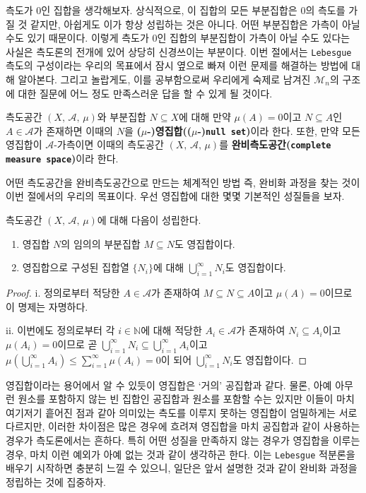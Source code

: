 측도가 0인 집합을 생각해보자. 상식적으로, 이 집합의 모든 부분집합은 0의 측도를 가질 것 같지만, 아쉽게도 이가 항상 성립하는 것은 아니다. 어떤 부분집합은 가측이 아닐수도 있기 때문이다. 이렇게 측도가 0인 집합의 부분집합이 가측이 아닐 수도 있다는 사실은 측도론의 전개에 있어 상당히 신경쓰이는 부분이다. 이번 절에서는 \texttt{Lebesgue} 측도의 구성이라는 우리의 목표에서 잠시 옆으로 빠져 이런 문제를 해결하는 방법에 대해 알아본다. 그리고 놀랍게도, 이를 공부함으로써 우리에게 숙제로 남겨진 $\mathcal{M}_n$의 구조에 대한 질문에 어느 정도 만족스러운 답을 할 수 있게 될 것이다.

\begin{definition}
    측도공간 $(X,\,\mathcal{A},\,\mu)$와 부분집합 $N\subseteq X$에 대해 만약 $\mu(A)=0$이고 $N\subseteq A$인 $A\in\mathcal{A}$가 존재하면 이때의 $N$을 \textbf{($\mu$-)영집합(($\mu$-)\texttt{null set})}이라 한다. 또한, 만약 모든 영집합이 $\mathcal{A}$-가측이면 이때의 측도공간 $(X,\,\mathcal{A},\,\mu)$를 \textbf{완비측도공간(\texttt{complete measure space})}이라 한다.
\end{definition}

어떤 측도공간을 완비측도공간으로 만드는 체계적인 방법 즉, 완비화 과정을 찾는 것이 이번 절에서의 우리의 목표이다. 우선 영집합에 대한 몇몇 기본적인 성질들을 보자.

\begin{proposition}\label{prop:nullSet}
    측도공간 $(X,\,\mathcal{A},\,\mu)$에 대해 다음이 성립한다.
    \begin{enumerate}
        \item 영집합 $N$의 임의의 부분집합 $M\subseteq N$도 영집합이다.
        \item 영집합으로 구성된 집합열 $\{N_i\}$에 대해 $\bigcup_{i=1}^\infty N_i$도 영집합이다.
    \end{enumerate}
\end{proposition}

\begin{proof}
    i. 정의로부터 적당한 $A\in\mathcal{A}$가 존재하여 $M\subseteq N\subseteq A$이고 $\mu(A)=0$이므로 이 명제는 자명하다.

    ii. 이번에도 정의로부터 각 $i\in\mathbb{N}$에 대해 적당한 $A_i\in\mathcal{A}$가 존재하여 $N_i\subseteq A_i$이고 $\mu(A_i)=0$이므로 곧 $\bigcup_{i=1}^\infty N_i\subseteq\bigcup_{i=1}^\infty A_i$이고 $\mu(\bigcup_{i=1}^\infty A_i)\leq\sum_{i=1}^\infty\mu(A_i)=0$이 되어 $\bigcup_{i=1}^\infty N_i$도 영집합이다.
\end{proof}

영집합이라는 용어에서 알 수 있듯이 영집합은 `거의' 공집합과 같다. 물론, 아예 아무런 원소를 포함하지 않는 빈 집합인 공집합과 원소를 포함할 수는 있지만 이들이 마치 여기저기 흩어진 점과 같아 의미있는 측도를 이루지 못하는 영집합이 엄밀하게는 서로 다르지만, 이러한 차이점은 많은 경우에 흐려져 영집합을 마치 공집합과 같이 사용하는 경우가 측도론에서는 흔하다. 특히 어떤 성질을 만족하지 않는 경우가 영집합을 이루는 경우, 마치 이런 예외가 아예 없는 것과 같이 생각하곤 한다. 이는 \texttt{Lebesgue} 적분론을 배우기 시작하면 충분히 느낄 수 있으니, 일단은 앞서 설명한 것과 같이 완비화 과정을 정립하는 것에 집중하자.


